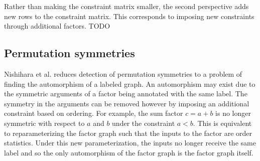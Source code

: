 Rather than making the constraint matrix smaller, the second perspective adds new rows to the constraint matrix. This corresponds to imposing new constraints through additional factors. TODO


\subsection{Permutation symmetries}

Nishihara et al. reduces detection of permutation symmetries to a problem of finding the automorphism of a labeled graph. An automorphism may exist due to the symmetric arguments of a factor being annotated with the same label. The symmetry in the arguments can be removed however by imposing an additional constraint based on ordering. For example, the sum factor $c=a+b$ is no longer symmetric with respect to $a$ and $b$ under the constraint $a<b$. This is equivalent to reparameterizing the factor graph such that the inputs to the factor are order statistics. Under this new parameterization, the inputs no longer receive the same label and so the only automorphism of the factor graph is the factor graph itself.


